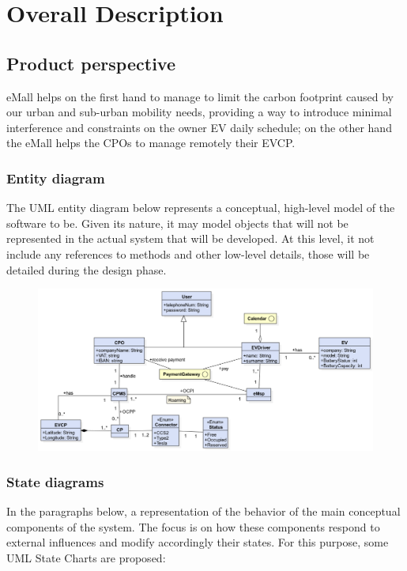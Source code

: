 \section{Overall Description}

\subsection{Product perspective}
eMall helps on the first hand to manage to limit the carbon footprint caused by our urban and sub-urban mobility needs,
providing a way to introduce minimal interference and constraints on the owner EV daily schedule;
on the other hand the eMall helps the CPOs to manage remotely their EVCP. 
\vspace{1cm}
\subsubsection{Entity diagram}
The UML entity diagram below represents a conceptual, high-level model of
the software to be. Given its nature, it may model objects that will not 
be represented in the actual system that will be developed. At this 
level, it not include any references to methods and other low-level 
details, those will be detailed during the design phase.
\begin{figure}[H]
      \centering
      \includegraphics[scale=0.4]{src/domain_UML.png}
\end{figure} \vspace{1cm}

\subsubsection{State diagrams}
In the paragraphs below, a representation of the behavior of the main conceptual
components of the system. The focus is on how these components respond to
external influences and modify accordingly their states. For this purpose,
some UML State Charts are proposed:


